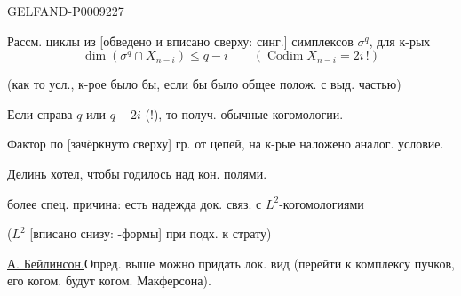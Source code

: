 \begin{GelfandAdjacentEvidence}{GELFAND-P000922}{7}


Рассм. циклы из [обведено и вписано сверху: синг.] симплексов $\sigma^q$, для к-рых
\begin{equation*}
 \dim(\sigma^q\cap X_{n-i})\leq q-i
 \qquad (\operatorname{Codim}X_{n-i}=2i\,!)
 \tag{3}
\end{equation*}

(как то усл., к-рое было бы, если бы было общее полож. с выд. частью)

Если справа $q$ или $q-2i$ (!), то получ. обычные когомологии.

Фактор по [зачёркнуто сверху] гр. от цепей, на к-рые наложено аналог. условие.
\end{GelfandAdjacentEvidence}



Делинь хотел, чтобы годилось над кон. полями.

более спец. причина: есть надежда док. связ. с $L^2$-когомологиями

($L^2$ [вписано снизу: -формы] при подх. к страту)

\underline{А. Бейлинсон.}\quad Опред. выше можно придать лок. вид (перейти к комплексу пучков, его когом. будут когом. Макферсона).


